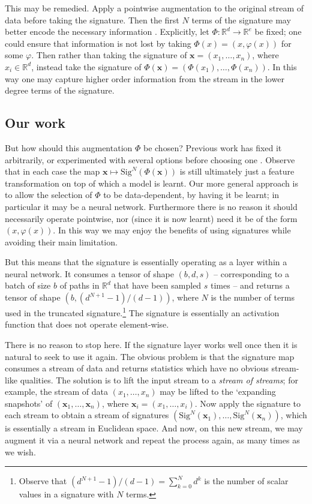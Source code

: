 \documentclass{article}
\theoremstyle{plain}
\theoremstyle{definition}
\begin{document}
	This may be remedied. Apply a pointwise augmentation to the original stream of data before taking the signature. Then the first $N$ terms of the signature may better encode the necessary information \cite{kiraly2016kernels, chevyrev2018signature}. Explicitly, let $\Phi \colon \mathbb R^d \to \mathbb R^e$ be fixed; one could ensure that information is not lost by taking $\Phi(x) = (x, \varphi(x))$ for some $\varphi$. Then rather than taking the signature of $\mathbf x = (x_1, \ldots, x_n)$, where $x_i \in \mathbb R^d$, instead take the signature of $\Phi(\mathbf x) = (\Phi(x_1), \ldots, \Phi(x_n))$. In this way one may capture higher order information from the stream in the lower degree terms of the signature.
	
	\subsection{Our work}
	But how should this augmentation $\Phi$ be chosen? Previous work has fixed it arbitrarily, or experimented with several options before choosing one \cite{kiraly2016kernels, chevyrev2018signature}. Observe that in each case the map $\mathbf x \mapsto \mathrm{Sig}^N(\Phi(\mathbf x))$ is still ultimately just a feature transformation on top of which a model is learnt. Our more general approach is to allow the selection of $\Phi$ to be data-dependent, by having it be learnt; in particular it may be a neural network. Furthermore there is no reason it should necessarily operate pointwise, nor (since it is now learnt) need it be of the form $ (x, \varphi(x)) $. In this way we may enjoy the benefits of using signatures while avoiding their main limitation.
	
	But this means that the signature is essentially operating as a layer within a neural network. It consumes a tensor of shape $(b, d, s)$ -- corresponding to a batch of size $b$ of paths in $\mathbb R^d$ that have been sampled $s$ times -- and returns a tensor of shape $(b, (d^{N + 1} - 1)/(d - 1))$, where $N$ is the number of terms used in the truncated signature.\footnote{Observe that $(d^{N + 1} - 1)/(d - 1) = \sum_{k = 0}^N d^k$ is the number of scalar values in a signature with $N$ terms.} The signature is essentially an activation function that does not operate element-wise.
	
	There is no reason to stop here. If the signature layer works well once then it is natural to seek to use it again. The obvious problem is that the signature map consumes a stream of data and returns statistics which have no obvious stream-like qualities. The solution is to lift the input stream to a \emph{stream of streams}; for example, the stream of data $(x_1, \ldots, x_n)$ may be lifted to the `expanding snapshots' of $(\mathbf x_1, \ldots, \mathbf x_n)$, where $\mathbf x_i = (x_1, \ldots, x_i)$. Now apply the signature to each stream to obtain a stream of signatures $(\mathrm{Sig}^N(\mathbf x_1), \ldots, \mathrm{Sig}^N(\mathbf x_n))$, which is essentially a stream in Euclidean space. %
	And now, on this new stream, we may augment it via a neural network and repeat the process again, as many times as we wish.
	
\end{document}
